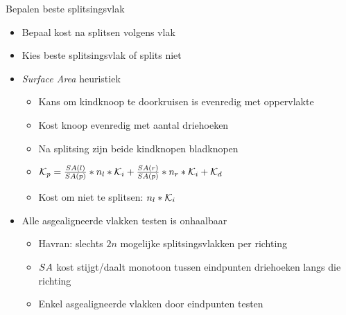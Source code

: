 \documentclass[11pt,t]{beamer}
\begin{document}
\begin{frame}{Bepalen beste splitsingsvlak}
	\begin{itemize}
	\item Bepaal kost na splitsen volgens vlak
	\item Kies beste splitsingsvlak of splits niet
	\pause
	\item \textit{Surface Area} heuristiek
		\begin{itemize}
			\item Kans om kindknoop te doorkruisen is evenredig met oppervlakte
			\item Kost knoop evenredig met aantal driehoeken
			\item Na splitsing zijn beide kindknopen bladknopen
			\item $\mathcal{K}_p = \frac{SA(l)}{SA(p)}*n_l*\mathcal{K}_i + \frac{SA(r)}{SA(p)}*n_r*\mathcal{K}_i + \mathcal{K}_d$
			\item Kost om niet te splitsen: $n_l*\mathcal{K}_i$
		\end{itemize}
	\pause
	\item Alle asgealigneerde vlakken testen is onhaalbaar
		\begin{itemize}
			\item Havran: slechts $2n$ mogelijke splitsingsvlakken per richting
			\item $SA$ kost stijgt/daalt monotoon tussen eindpunten driehoeken langs die richting
			\item Enkel asgealigneerde vlakken door eindpunten testen
		\end{itemize}
	\end{itemize}
\end{frame}
\end{document}

